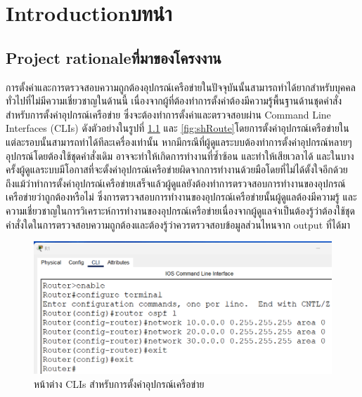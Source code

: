 \chapter{\ifenglish Introduction\else บทนำ\fi}

\section{\ifenglish Project rationale\else ที่มาของโครงงาน\fi}
\hspace{0.5in}
การตั้งค่าและการตรวจสอบความถูกต้องอุปกรณ์เครือข่ายในปัจจุบันนั้นสามารถทำได้ยากสำหรับบุคคลทั่วไปที่ไม่มีความเชี่ยวชาญในด้านนี้ เนื่องจากผู้ที่ต้องทำการตั้งค่าต้องมีความรู้พื้นฐานด้านชุดคำสั่งสำหรับการตั้งค่าอุปกรณ์เครือข่าย ซึ่งจะต้องทำการตั้งค่าและตรวจสอบผ่าน Command Line Interfaces (CLIs) ดังตัวอย่างในรูปที่ \ref{fig:RouterCLIs} และ \ref{fig:shRoute}โดยการตั้งค่าอุปกรณ์เครือข่ายในแต่ละรอบนั้นสามารถทำได้ทีละเครื่องเท่านั้น หากมีกรณีที่ผู้ดูแลระบบต้องทำการตั้งค่าอุปกรณ์หลายๆอุปกรณ์โดยต้องใช้ชุดคำสั่งเดิม อาจจะทำให้เกิดการทำงานที่ซ้ำซ้อน และทำให้เสียเวลาได้ และในบางครั้งผู้ดูแลระบบมีโอกาสที่จะตั้งค่าอุปกรณ์เครือข่ายผิดจากการทำงานด้วยมือโดยที่ไม่ได้ตั้งใจอีกด้วย
ถึงแม้ว่าทำการตั้งค่าอุปกรณ์เครือข่ายเสร็จแล้วผู้ดูแลยังต้องทำการตรวจสอบการทำงานของอุปกรณ์เครือข่ายว่าถูกต้องหรือไม่ ซึ่งการตรวจสอบการทำงานของอุปกรณ์เครือข่ายนั้นผู้ดูแลต้องมีความรู้ และความเชี่ยวชาญในการวิเคราะห์การทำงานของอุปกรณ์เครือข่ายเนื่องจากผู้ดูแลจำเป็นต้องรู้ว่าต้องใช้ชุดคำสั่งใดในการตรวจสอบความถูกต้องและต้องรู้ว่าควรตรวจสอบข้อมูลส่วนไหนจาก output ที่ได้มา


\begin{figure}[h]
    \begin{center}
      \includegraphics[scale=0.3]{RouterConf.png}
    \end{center}
    \caption[หน้าต่าง CLIs สำหรับการตั้งค่าอุปกรณ์เครือข่าย]{หน้าต่าง CLIs สำหรับการตั้งค่าอุปกรณ์เครือข่าย}
    \label{fig:RouterCLIs}
  \end{figure}

